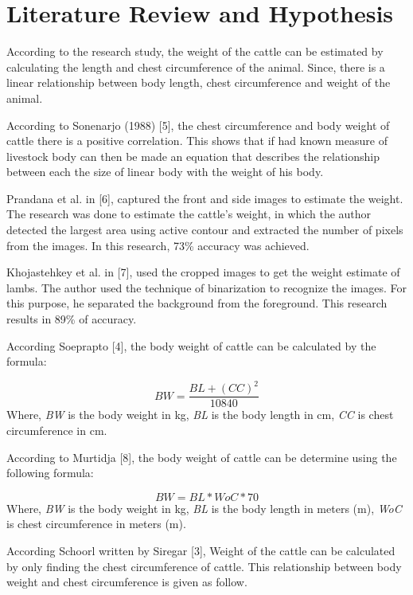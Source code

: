 \documentclass{article}
\begin{document}
\section{Literature Review and Hypothesis}
\label{sec:format}
According to the research study, the weight of the cattle can be estimated by calculating the length and chest circumference of the animal. Since, there is a linear relationship between body length, chest circumference and weight of the animal.

According to Sonenarjo (1988) [5], the chest circumference and body weight of cattle there is a positive correlation. This shows that if had known measure of livestock body can then be made an equation that describes the relationship between each the size of linear body with the weight of his body. 

Prandana et al. in [6], captured the front and side images to estimate the weight. The research was done to estimate the cattle’s weight, in which the author detected the largest area using active contour and extracted the number of pixels from the images. In this research, 73\% accuracy was achieved.

Khojastehkey et al. in [7], used the cropped images to get the weight estimate of lambs. The author used the technique of binarization to recognize the images. For this purpose, he separated the background from the foreground. This research results in 89\% of accuracy.

According Soeprapto [4], the body weight of cattle can be calculated by the formula:

\begin{equation}
    BW =\frac{ BL + (CC)^{2}}{10840}
\end{equation}
Where, \textit{BW} is the body weight in kg,
\textit{BL} is the body length in cm,
\textit{CC} is chest circumference in cm.

According to Murtidja [8], the body weight of cattle can be determine using the following formula:

\begin{equation}
    BW = BL * WoC *70
\end{equation}
Where, \textit{BW} is the body weight in kg,
\textit{BL} is the body length in meters (m),
\textit{WoC} is chest circumference in meters (m).

According Schoorl written by Siregar [3], Weight of the cattle can be calculated by only finding the chest circumference of cattle. This relationship between body weight and chest circumference is given as follow.
\end{document}
